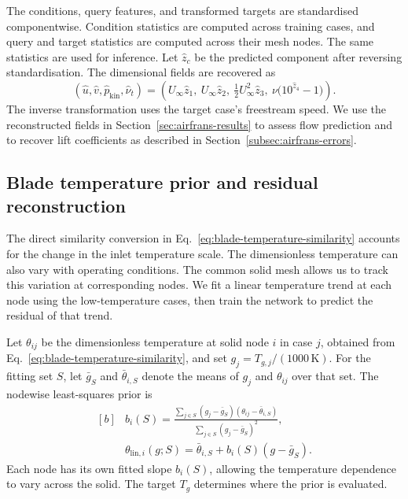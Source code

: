\documentclass[a4paper,fleqn]{cas-sc}
\begin{document}
The conditions, query features, and transformed targets are standardised componentwise.
Condition statistics are computed across training cases, and query and target statistics
are computed across their mesh nodes. The same statistics are used for inference.
Let $\widehat z_c$ be the predicted component after reversing standardisation.
The dimensional fields are recovered as
\begin{equation}
  \label{eq:airfoil-inverse}
  (\widehat u,\widehat v,\widehat p_{\mathrm{kin}},\widehat\nu_t)
  = \left(
    U_\infty\widehat z_1,\ U_\infty\widehat z_2,\
    \tfrac12 U_\infty^2\widehat z_3,\
    \nu\bigl(10^{\widehat z_4}-1\bigr)
  \right).
\end{equation}
The inverse transformation uses the target case's freestream speed. We use the
reconstructed fields in Section~\ref{sec:airfrans-results} to assess flow prediction
and to recover lift coefficients as described in Section~\ref{subsec:airfrans-errors}.

\subsection{Blade temperature prior and residual reconstruction}\label{subsec:blade-prior}
\par

The direct similarity conversion in Eq.~\eqref{eq:blade-temperature-similarity} accounts
for the change in the inlet temperature scale. The dimensionless temperature can also
vary with operating conditions. The common solid mesh allows us to track this variation
at corresponding nodes. We fit a linear temperature trend at each node using the
low-temperature cases, then train the network to predict the residual of that trend.

Let $\theta_{ij}$ be the dimensionless temperature at solid node $i$ in case $j$, obtained
from Eq.~\eqref{eq:blade-temperature-similarity}, and set $g_j=T_{g,j}/(1000\,\mathrm{K})$.
For the fitting set $S$, let $\bar g_S$ and $\bar\theta_{i,S}$ denote the means of $g_j$
and $\theta_{ij}$ over that set. The nodewise least-squares prior is
\begin{equation}
  \label{eq:blade-linear-prior}
  \begin{aligned}[b]
    &b_i(S) =
      \frac{\displaystyle\sum_{j\in S}(g_j-\bar g_S)
                   (\theta_{ij}-\bar\theta_{i,S})}
           {\displaystyle\sum_{j\in S}(g_j-\bar g_S)^2}, \\
    &\theta_{\mathrm{lin},i}(g;S)
      = \bar\theta_{i,S}+b_i(S)(g-\bar g_S).
  \end{aligned}
\end{equation}
Each node has its own fitted slope $b_i(S)$, allowing the temperature dependence to
vary across the solid. The target $T_g$ determines where the prior is evaluated.
\end{document}
